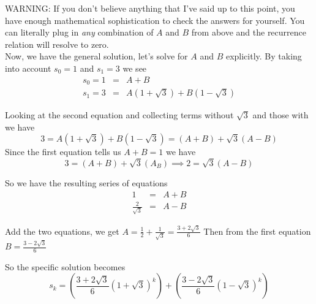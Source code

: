 \documentclass[16 pt]{amsart}
\theoremstyle{definition}
\theoremstyle{remark}
\numberwithin{equation}{section}
\begin{document}
WARNING:  If you don't believe anything that I've said up to this point, you have enough mathematical sophistication to check the answers for yourself.  You can literally plug in \emph{any} combination of $A$ and $B$ from above and the recurrence relation will resolve to zero.\\


Now, we have the general solution, let's solve for $A$ and $B$ explicitly.  By taking into account $s_0 =1$ and $s_1=3$ we see
\begin{eqnarray*}
s_0=1 &=& A + B\\
s_1=3 &=& A(1+\sqrt{3}) + B(1-\sqrt{3})
\end{eqnarray*}

Looking at the second equation and collecting terms without $\sqrt{3}$ and those with we have
\[
3 = A(1+\sqrt{3})+ B(1-\sqrt{3}) = (A+B) + \sqrt{3}(A-B)
\]
Since the first equation tells us $A+B=1$ we have
\[
3 = (A+B) + \sqrt{3}(A_B) \implies 2 = \sqrt{3}(A-B)
\]

So we have the resulting series of equations
\begin{eqnarray*}
1 & = & A+B\\
\frac{2}{\sqrt{3}} & = & A-B
\end{eqnarray*}

Add the two equations, we get $A = \frac{1}{2} + \frac{1}{\sqrt{3}} = \frac{3+2\sqrt{3}}{6}$ 
Then from the first equation $B = \frac{3-2\sqrt{3}}{6}$

So the specific solution becomes
\[
s_k = \left(\frac{3+2\sqrt{3}}{6}(1+\sqrt{3})^k\right) + \left(\frac{3-2\sqrt{3}}{6}(1-\sqrt{3})^k\right)
\]
\end{document}
